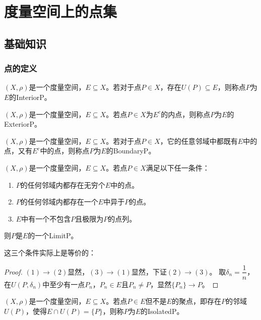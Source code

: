 \section{度量空间上的点集}
\subsection{基础知识}
\subsubsection{点的定义}
\begin{definition}
	$(X,\rho)$是一个度量空间，$E\subseteq X$。若对于点$P\in X$，存在$U(P)\subseteq E$，则称点$P$为$E$的\gls{InteriorP}。
\end{definition}
\begin{definition}
	$(X,\rho)$是一个度量空间，$E\subseteq X$。若点$P\in X$为$E^c$的内点，则称点$P$为$E$的\gls{ExteriorP}。
\end{definition}
\begin{definition}
	$(X,\rho)$是一个度量空间，$E\subseteq X$。若对于点$P\in X$，它的任意邻域中都既有$E$中的点，又有$E^c$中的点，则称点$P$为$E$的\gls{BoundaryP}。
\end{definition}
\begin{definition}
	$(X,\rho)$是一个度量空间，$E\subseteq X$。若点$P\in X$满足以下任一条件：
	\begin{enumerate}
		\item $P$的任何邻域内都存在无穷个$E$中的点。
		\item $P$的任何邻域内都存在一个$E$中异于$P$的点。
		\item $E$中有一个不包含$P$且极限为$P$的点列。
	\end{enumerate}
	则$P$是$E$的一个\gls{LimitP}。
\end{definition}
这三个条件实际上是等价的：
\begin{proof}
	$(1)\to(2)$显然，$(3)\to(1)$显然，下证$(2)\to(3)$。
	取$\delta_n=\dfrac{1}{n}$，在$U(P,\delta_n)$中至少有一点$P_n$，$P_n\in E$且$P_n\ne P$，显然$\{P_n\}\to P$。
\end{proof}
\begin{definition}
	$(X,\rho)$是一个度量空间，$E\subseteq X$。若点$P\in E$但不是$E$的聚点，即存在$P$的邻域$U(P)$，使得$E\cap U(P)=\{P\}$，则称$P$为$E$的\gls{IsolatedP}。
\end{definition}
